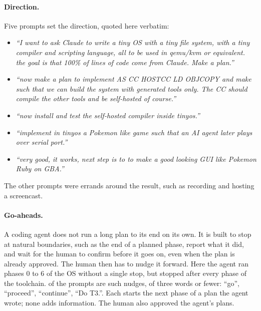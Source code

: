 \documentclass{article}
\begin{document}
\paragraph{Direction.} Five prompts set the direction, quoted here verbatim:
\begin{itemize}
  \item \emph{``I want to ask Claude to write a tiny OS with a tiny file system, with a tiny
        compiler and scripting language, all to be used in qemu/kvm or equivalent. the goal
        is that 100\% of lines of code come from Claude. Make a plan.''}
  \item \emph{``now make a plan to implement AS CC HOSTCC LD OBJCOPY and make such that we
        can build the system with generated tools only. The CC should compile the other
        tools and be self-hosted of course.''}
  \item \emph{``now install and test the self-hosted compiler inside tinyos.''}
  \item \emph{``implement in tinyos a Pokemon like game such that an AI agent later plays
        over serial port.''}
  \item \emph{``very good, it works, next step is to to make a good looking GUI like
        Pokemon Ruby on GBA.''}
\end{itemize}
The other prompts were errands around the result, such as recording and hosting a
screencast.

\paragraph{Go-aheads.} A coding agent does not run a long plan to its end on its own. It
is built to stop at natural boundaries, such as the end of a planned phase, report what it
did, and wait for the human to confirm before it goes on, even when the plan is already
approved. The human then has to nudge it forward. Here the agent ran phases 0 to 6 of the
OS without a single stop, but stopped after every phase of the toolchain.
\ngoaheads{} of the \nprompts{} prompts are such nudges, of three words or fewer:
``go'', ``proceed'', ``continue'', ``Do T3.''. Each starts the next phase of a plan the
agent wrote; none adds information. The human also approved the agent's \napprovals{}
plans.
\end{document}
